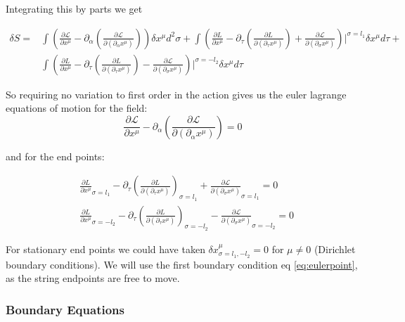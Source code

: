 \documentclass[11pt,a4paper]{article}
\begin{document}
Integrating this by parts we get

\begin{align*}
\delta S=&\int\left(\frac{\partial\mathcal{L}}{\partial x^{\mu}}-\partial_{\alpha}\left(\frac{\partial\mathcal{L}}{\partial(\partial_{\alpha}x^{\mu})}\right)\right)\delta x^{\mu}d^{2}\sigma+
\int\left(\frac{\partial L}{\partial x^{\mu}}-\partial_{\tau}\left(\frac{\partial L}{\partial(\partial_{\tau}x^{\mu})}\right)+\frac{\partial\mathcal{L}}{\partial(\partial_{\sigma}x^{\mu})}\right)|^{\sigma=l_{1}}\delta x^{\mu}d\tau+\\
&\int\left(\frac{\partial L}{\partial x^{\mu}}-\partial_{\tau}\left(\frac{\partial L}{\partial(\partial_{\tau}x^{\mu})}\right)-\frac{\partial\mathcal{L}}{\partial(\partial_{\sigma}x^{\mu})}\right)|^{\sigma=-l_{2}}\delta x^{\mu}d\tau
\end{align*} 

So requiring no variation to first order in the action gives us the euler lagrange equations of motion for the field:
\begin{equation}
\label{eq:eulerfield}
\frac{\partial\mathcal{L}}{\partial x^{\mu}}-\partial_{\alpha}\left(\frac{\partial\mathcal{L}}{\partial(\partial_{\alpha}x^{\mu})}\right)=0
\end{equation}

and for the end points:

\begin{subequations}
\label{eq:eulerpoint}
\begin{align}
&\frac{\partial L}{\partial x^{\mu}}_{\sigma=l_{1}}-\partial_{\tau}\left(\frac{\partial L}{\partial(\partial_{\tau}x^{\mu})}\right)_{\sigma=l_{1}}+\frac{\partial\mathcal{L}}{\partial(\partial_{\sigma}x^{\mu})}_{\sigma=l_{1}}=0
\\
&\frac{\partial L}{\partial x^{\mu}}_{\sigma=-l_{2}}-\partial_{\tau}\left(\frac{\partial L}{\partial(\partial_{\tau}x^{\mu})}\right)_{\sigma=-l_{2}}-\frac{\partial\mathcal{L}}{\partial(\partial_{\sigma}x^{\mu})}_{\sigma=-l_{2}}=0
\end{align}
\end{subequations}

For stationary end points we could have taken $\delta x^{\mu}_{\sigma=l_1,-l_2}=0$ for $\mu\neq0$ (Dirichlet boundary conditions). We will use the first boundary condition eq \ref{eq:eulerpoint}, as the string endpoints are free to move.

\FloatBarrier
\subsubsection{Boundary Equations}
\label{sec:boundaryequations}
\end{document}
